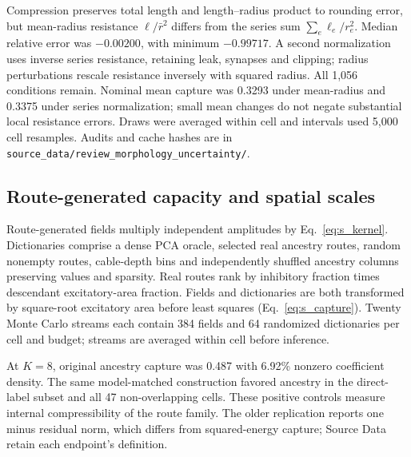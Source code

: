 Compression preserves total length and length--radius product to rounding error, but mean-radius resistance $\ell/\bar r^2$ differs from the series sum $\sum_e\ell_e/r_e^2$. Median relative error was $-0.00200$, with minimum $-0.99717$. A second normalization uses inverse series resistance, retaining leak, synapses and clipping; radius perturbations rescale resistance inversely with squared radius. All 1,056 conditions remain. Nominal mean capture was 0.3293 under mean-radius and 0.3375 under series normalization; small mean changes do not negate substantial local resistance errors. Draws were averaged within cell and intervals used 5,000 cell resamples. Audits and cache hashes are in \texttt{source\_data/review\_morphology\_uncertainty/}.

\subsection{Route-generated capacity and spatial scales}
\label{note:structural_capacity}
Route-generated fields multiply independent amplitudes by Eq.~\ref{eq:s_kernel}. Dictionaries comprise a dense PCA oracle, selected real ancestry routes, random nonempty routes, cable-depth bins and independently shuffled ancestry columns preserving values and sparsity. Real routes rank by inhibitory fraction times descendant excitatory-area fraction. Fields and dictionaries are both transformed by square-root excitatory area before least squares (Eq.~\ref{eq:s_capture}). Twenty Monte Carlo streams each contain 384 fields and 64 randomized dictionaries per cell and budget; streams are averaged within cell before inference.

At $K=8$, original ancestry capture was 0.487 with 6.92\% nonzero coefficient density. The same model-matched construction favored ancestry in the direct-label subset and all 47 non-overlapping cells. These positive controls measure internal compressibility of the route family. The older replication reports one minus residual norm, which differs from squared-energy capture; Source Data retain each endpoint's definition.

